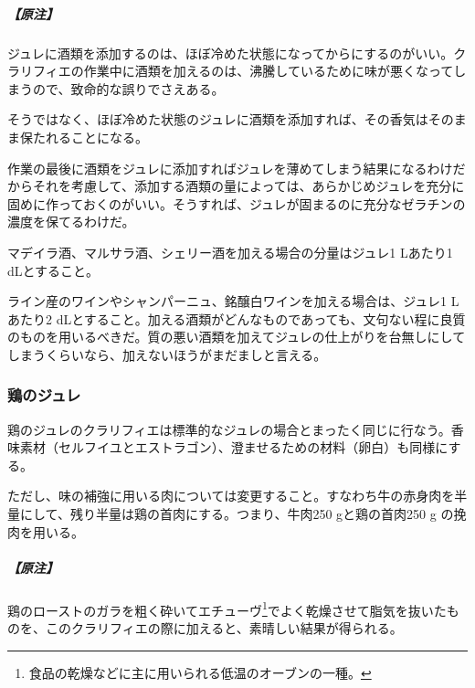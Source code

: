 \begin{recette}
\hypertarget{nota-gelees-grasses-ordinaires}{%
\subparagraph{【原注】}\label{nota-gelees-grasses-ordinaires}}

ジュレに酒類を添加するのは、ほぼ冷めた状態になってからにするのがいい。クラリフィエの作業中に酒類を加えるのは、沸騰しているために味が悪くなってしまうので、致命的な誤りでさえある。

そうではなく、ほぼ冷めた状態のジュレに酒類を添加すれば、その香気はそのまま保たれることになる。

作業の最後に酒類をジュレに添加すればジュレを薄めてしまう結果になるわけだからそれを考慮して、添加する酒類の量によっては、あらかじめジュレを充分に固めに作っておくのがいい。そうすれば、ジュレが固まるのに充分なゼラチンの濃度を保てるわけだ。

マデイラ酒、マルサラ酒、シェリー酒を加える場合の分量はジュレ1 Lあたり1
dLとすること。

ライン産のワインやシャンパーニュ、銘醸白ワインを加える場合は、ジュレ1
Lあたり2
dLとすること。加える酒類がどんなものであっても、文句ない程に良質のものを用いるべきだ。質の悪い酒類を加えてジュレの仕上がりを台無しにしてしまうくらいなら、加えないほうがまだましと言える。

\hypertarget{gelee-de-volaille}{%
\subsubsection{鶏のジュレ}\label{gelee-de-volaille}}



鶏のジュレのクラリフィエは標準的なジュレの場合とまったく同じに行なう。香味素材（セルフイユとエストラゴン）、澄ませるための材料（卵白）も同様にする。

ただし、味の補強に用いる肉については変更すること。すなわち牛の赤身肉を半量にして、残り半量は鶏の首肉にする。つまり、牛肉250
gと鶏の首肉250 g の挽肉を用いる。

\hypertarget{nota-gelee-de-volaile}{%
\subparagraph{【原注】}\label{nota-gelee-de-volaile}}

鶏のローストのガラを粗く砕いてエチューヴ\footnote{食品の乾燥などに主に用いられる低温のオーブンの一種。}でよく乾燥させて脂気を抜いたものを、このクラリフィエの際に加えると、素晴しい結果が得られる。


\end{recette}
